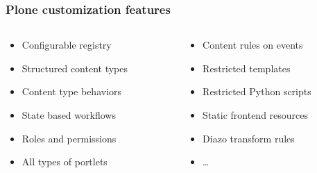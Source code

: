 \documentclass[aspectratio=43]{beamer}
\begin{document}
\begin{frame}[plain,t]
  \frametitle{Plone customization features}
  \begin{columns}[onlytextwidth,t]
  \begin{column}{0.45\textwidth}
  \begin{itemize}[<+->]
  \setlength{\itemsep}{1em}
  \item Configurable registry
  \item Structured content types
  \item Content type behaviors
  \item State based workflows
  \item Roles and permissions
  \item All types of portlets
  \end{itemize}
  \end{column}
  \begin{column}{0.45\textwidth}
  \begin{itemize}[<+->]
  \setlength{\itemsep}{1em}
  \item Content rules on events
  \item Restricted templates
  \item Restricted Python scripts
  \item Static frontend resources
  \item Diazo transform rules
  \item \ldots
  \end{itemize}
  \end{column}
  \end{columns}
\end{frame}
\end{document}

